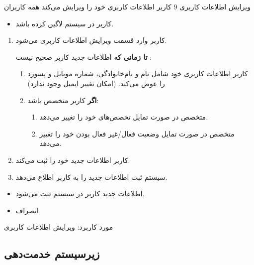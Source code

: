 {
	\usecase
	{ویرایش اطلاعات کاربری}
	{9}
	{کاربر اطلاعات کاربری خود را ویرایش می‌کند}
	{همه کاربران}
	{}
	{
		\begin{itemize}
			\item 
		کاربر در سیستم لاگین کرده باشد.
			
		\end{itemize}
	}
	{
		\begin{enumerate}
			\item 
	کاربر وارد قسمت ویرایش اطلاعات کاربری می‌شود.
	
	\textbf{تا زمانی که} اطلاعات جدید کاربر صحیح نیست :
	
	\begin{enumerate}[label=\theenumi.\arabic*.]
			\item
	کاربر اطلاعات کاربری خود شامل نام و نام‌خانوادگی، شماره موبایل و پسورد را عوض می‌کند. (امکان تغییر ایمیل وجود ندارد)
			
			\item
			\textbf{اگر} کاربر متخصص باشد:
			\begin{enumerate}
				\item 
				متخصص در صورت تمایل تخصص‌های خود را تغییر می‌دهد.
				
								\item 
				متخصص در صورت تمایل وضعیت فعال/غیر فعال بودن خود را تغییر می‌دهد.
			\end{enumerate}
			
			\end{enumerate}
		
			\item
			کاربر اطلاعات جدید خود را ثبت می‌کند.
			
			\item
			سیستم ثبت اطلاعات جدید را به کاربر اطلاع می‌دهد.
			
		\end{enumerate}
	}
	{\begin{itemize}
			\item
			اطلاعات جدید کاربر در سیستم ثبت می‌شود.
	\end{itemize}}
	{
		\begin{itemize}
			\item انصراف
		\end{itemize}
	}
	{مورد کاربرد: ویرایش اطلاعات کاربری}
	
	
	
}


\newpage
\subsection{زیرسیستم خدمت‌دهی}

